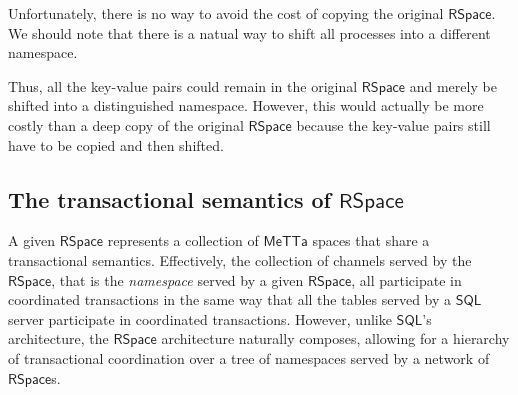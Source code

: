 Unfortunately, there is no way to avoid the cost of copying the
original $\mathsf{RSpace}$. We should note that there is a natual way
to shift all processes into a different namespace.


Thus, all the key-value pairs could remain in the original
$\mathsf{RSpace}$ and merely be shifted into a distinguished
namespace. However, this would actually be more costly than a deep
copy of the original $\mathsf{RSpace}$ because the key-value pairs
still have to be copied and then shifted.

\subsection{The transactional semantics of $\mathsf{RSpace}$}

A given $\mathsf{RSpace}$ represents a collection of $\mathsf{MeTTa}$
spaces that share a transactional semantics. Effectively, the
collection of channels served by the $\mathsf{RSpace}$, that is the
\emph{namespace} served by a given $\mathsf{RSpace}$, all participate
in coordinated transactions in the same way that all the tables served
by a $\mathsf{SQL}$ server participate in coordinated
transactions. However, unlike $\mathsf{SQL}$'s architecture, the
$\mathsf{RSpace}$ architecture naturally composes, allowing for a
hierarchy of transactional coordination over a tree of namespaces served by a network of $\mathsf{RSpace}$s.
